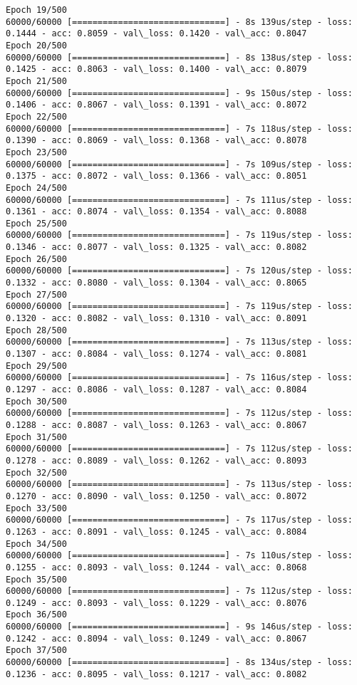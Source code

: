 \documentclass[11pt]{article}
\begin{document}
\begin{Verbatim}[commandchars=\\\{\}]
Epoch 19/500
60000/60000 [==============================] - 8s 139us/step - loss: 0.1444 - acc: 0.8059 - val\_loss: 0.1420 - val\_acc: 0.8047
Epoch 20/500
60000/60000 [==============================] - 8s 138us/step - loss: 0.1425 - acc: 0.8063 - val\_loss: 0.1400 - val\_acc: 0.8079
Epoch 21/500
60000/60000 [==============================] - 9s 150us/step - loss: 0.1406 - acc: 0.8067 - val\_loss: 0.1391 - val\_acc: 0.8072
Epoch 22/500
60000/60000 [==============================] - 7s 118us/step - loss: 0.1390 - acc: 0.8069 - val\_loss: 0.1368 - val\_acc: 0.8078
Epoch 23/500
60000/60000 [==============================] - 7s 109us/step - loss: 0.1375 - acc: 0.8072 - val\_loss: 0.1366 - val\_acc: 0.8051
Epoch 24/500
60000/60000 [==============================] - 7s 111us/step - loss: 0.1361 - acc: 0.8074 - val\_loss: 0.1354 - val\_acc: 0.8088
Epoch 25/500
60000/60000 [==============================] - 7s 119us/step - loss: 0.1346 - acc: 0.8077 - val\_loss: 0.1325 - val\_acc: 0.8082
Epoch 26/500
60000/60000 [==============================] - 7s 120us/step - loss: 0.1332 - acc: 0.8080 - val\_loss: 0.1304 - val\_acc: 0.8065
Epoch 27/500
60000/60000 [==============================] - 7s 119us/step - loss: 0.1320 - acc: 0.8082 - val\_loss: 0.1310 - val\_acc: 0.8091
Epoch 28/500
60000/60000 [==============================] - 7s 113us/step - loss: 0.1307 - acc: 0.8084 - val\_loss: 0.1274 - val\_acc: 0.8081
Epoch 29/500
60000/60000 [==============================] - 7s 116us/step - loss: 0.1297 - acc: 0.8086 - val\_loss: 0.1287 - val\_acc: 0.8084
Epoch 30/500
60000/60000 [==============================] - 7s 112us/step - loss: 0.1288 - acc: 0.8087 - val\_loss: 0.1263 - val\_acc: 0.8067
Epoch 31/500
60000/60000 [==============================] - 7s 112us/step - loss: 0.1278 - acc: 0.8089 - val\_loss: 0.1262 - val\_acc: 0.8093
Epoch 32/500
60000/60000 [==============================] - 7s 113us/step - loss: 0.1270 - acc: 0.8090 - val\_loss: 0.1250 - val\_acc: 0.8072
Epoch 33/500
60000/60000 [==============================] - 7s 117us/step - loss: 0.1263 - acc: 0.8091 - val\_loss: 0.1245 - val\_acc: 0.8084
Epoch 34/500
60000/60000 [==============================] - 7s 110us/step - loss: 0.1255 - acc: 0.8093 - val\_loss: 0.1244 - val\_acc: 0.8068
Epoch 35/500
60000/60000 [==============================] - 7s 112us/step - loss: 0.1249 - acc: 0.8093 - val\_loss: 0.1229 - val\_acc: 0.8076
Epoch 36/500
60000/60000 [==============================] - 9s 146us/step - loss: 0.1242 - acc: 0.8094 - val\_loss: 0.1249 - val\_acc: 0.8067
Epoch 37/500
60000/60000 [==============================] - 8s 134us/step - loss: 0.1236 - acc: 0.8095 - val\_loss: 0.1217 - val\_acc: 0.8082

\end{Verbatim}
\end{document}
